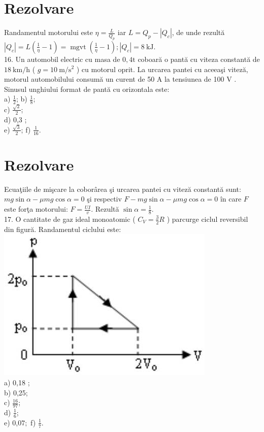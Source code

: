 \section*{Rezolvare}
Randamentul motorului este $\eta=\frac{L}{Q_{p}}$ iar $L=Q_{p}-\left|Q_{c}\right|$, de unde rezultă\\
$\left|Q_{c}\right|=L\left(\frac{1}{\eta}-1\right)=\operatorname{mgvt}\left(\frac{1}{\eta}-1\right) ;\left|Q_{c}\right|=8 \mathrm{~kJ}$.\\
16. Un automobil electric cu masa de $0,4 \mathrm{t}$ coboară o pantă cu viteza constantă de $18 \mathrm{~km} / \mathrm{h}$ ( $g=10 \mathrm{~m} / \mathrm{s}^{2}$ ) cu motorul oprit. La urcarea pantei cu aceeaşi viteză, motorul automobilului consumă un curent de 50 A la tensiunea de 100 V . Sinusul unghiului format de pantă cu orizontala este:\\
a) $\frac{1}{2}$; b) $\frac{1}{8}$;\\
c) $\frac{\sqrt{2}}{2}$;\\
d) 0,3 ;\\
e) $\frac{\sqrt{3}}{2}$; f) $\frac{1}{16}$.

\section*{Rezolvare}
Ecuaţiile de mişcare la coborârea şi urcarea pantei cu viteză constantă sunt: $m g \sin \alpha-\mu m g \cos \alpha=0$ şi respectiv $F-m g \sin \alpha-\mu m g \cos \alpha=0$ în care $F$ este forţa motorului: $F=\frac{U I}{v}$. Rezultă $\sin \alpha=\frac{1}{8}$.\\
17. O cantitate de gaz ideal monoatomic ( $C_{V}=\frac{3}{2} R$ ) parcurge ciclul reversibil din figură. Randamentul ciclului este:\\
\includegraphics[width=0.4\linewidth]{images/2025_08_19_9e83650bd9c853eca85eg-10}\\
a) 0,18 ;\\
b) 0,25;\\
c) $\frac{16}{97}$;\\
d) $\frac{1}{6}$;\\
e) 0,$07 ;$ f) $\frac{1}{7}$.

